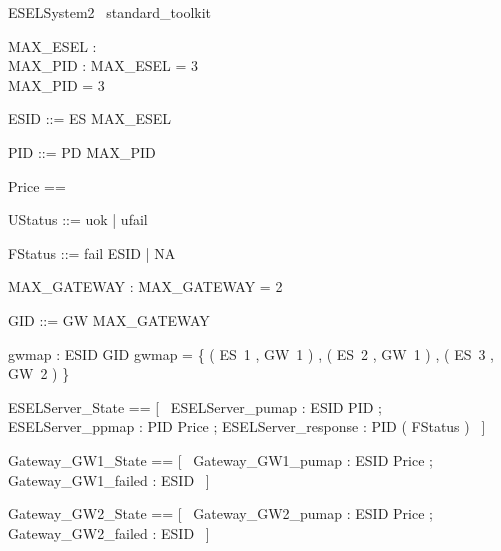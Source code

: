 \documentclass{article}
\begin{document}
\begin{zsection}
    \SECTION ESELSystem2 \parents~standard\_toolkit
\end{zsection}

\begin{axdef}
	MAX\_ESEL : \nat \\
 MAX\_PID : \nat 
\where
 MAX\_ESEL = 3 \\
 MAX\_PID = 3
\end{axdef}

\begin{zed}
	ESID ::= ES  \upto MAX\_ESEL \rdata
\end{zed}

\begin{zed}
	PID ::= PD  \upto MAX\_PID \rdata
\end{zed}

\begin{zed}
	Price == \nat
\end{zed}

\begin{zed}
	UStatus ::= uok | ufail
\end{zed}

\begin{zed}
	FStatus ::= fail \ldata ESID \rdata | NA
\end{zed}

\begin{axdef}
	MAX\_GATEWAY : \nat 
\where
 MAX\_GATEWAY = 2
\end{axdef}

\begin{zed}
	GID ::= GW  \upto MAX\_GATEWAY \rdata
\end{zed}

\begin{axdef}
	gwmap : ESID \fun GID 
\where
 gwmap = \{ ( ES~1 , GW~1 ) , ( ES~2 , GW~1 ) , ( ES~3 , GW~2 ) \}
\end{axdef}

\begin{zed}
	ESELServer\_State == [~  ESELServer\_pumap : ESID \pfun PID ; ESELServer\_ppmap : PID \pfun Price ; ESELServer\_response : PID \pfun ( \power FStatus )  ~]
\end{zed}

\begin{zed}
	Gateway\_GW1\_State == [~  Gateway\_GW1\_pumap : ESID \pfun Price ; Gateway\_GW1\_failed : \power ESID  ~]
\end{zed}

\begin{zed}
	Gateway\_GW2\_State == [~  Gateway\_GW2\_pumap : ESID \pfun Price ; Gateway\_GW2\_failed : \power ESID  ~]
\end{zed}
\end{document}
